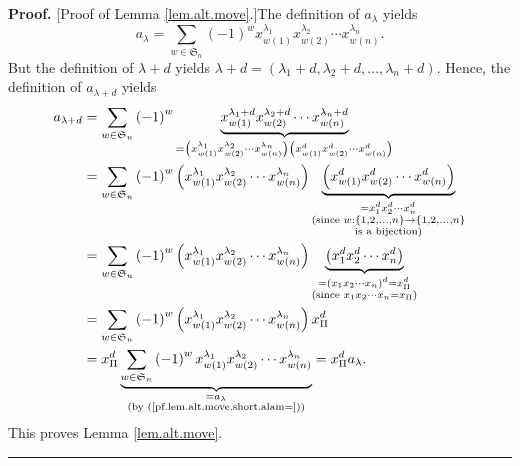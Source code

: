 \documentclass[numbers=enddot,12pt,final,onecolumn,notitlepage]{scrartcl}%
\theoremstyle{definition}
\newenvironment{proof}[1][Proof]{\noindent\textbf{#1.} }{\ \rule{0.5em}{0.5em}}
\let\sumnonlimits\sum
\renewcommand{\sum}{\sumnonlimits\limits}
\newenvironment{vershort}{}{}
\begin{document}
\begin{vershort}


\begin{proof}
[Proof of Lemma \ref{lem.alt.move}.]The definition of $a_{\lambda}$ yields%
\begin{equation}
a_{\lambda}=\sum_{w\in\mathfrak{S}_{n}}\left(  -1\right)  ^{w}x_{w\left(
1\right)  }^{\lambda_{1}}x_{w\left(  2\right)  }^{\lambda_{2}}\cdots
x_{w\left(  n\right)  }^{\lambda_{n}}. \label{pf.lem.alt.move.short.alam=}%
\end{equation}
But the definition of $\lambda+d$ yields $\lambda+d=\left(  \lambda
_{1}+d,\lambda_{2}+d,\ldots,\lambda_{n}+d\right)  $. Hence, the definition of
$a_{\lambda+d}$ yields%
\begin{align*}
a_{\lambda+d}  &  =\sum_{w\in\mathfrak{S}_{n}}\left(  -1\right)
^{w}\underbrace{x_{w\left(  1\right)  }^{\lambda_{1}+d}x_{w\left(  2\right)
}^{\lambda_{2}+d}\cdots x_{w\left(  n\right)  }^{\lambda_{n}+d}}_{=\left(
x_{w\left(  1\right)  }^{\lambda_{1}}x_{w\left(  2\right)  }^{\lambda_{2}%
}\cdots x_{w\left(  n\right)  }^{\lambda_{n}}\right)  \left(  x_{w\left(
1\right)  }^{d}x_{w\left(  2\right)  }^{d}\cdots x_{w\left(  n\right)  }%
^{d}\right)  }\\
&  =\sum_{w\in\mathfrak{S}_{n}}\left(  -1\right)  ^{w}\left(  x_{w\left(
1\right)  }^{\lambda_{1}}x_{w\left(  2\right)  }^{\lambda_{2}}\cdots
x_{w\left(  n\right)  }^{\lambda_{n}}\right)  \underbrace{\left(  x_{w\left(
1\right)  }^{d}x_{w\left(  2\right)  }^{d}\cdots x_{w\left(  n\right)  }%
^{d}\right)  }_{\substack{=x_{1}^{d}x_{2}^{d}\cdots x_{n}^{d}\\\text{(since
}w:\left\{  1,2,\ldots,n\right\}  \rightarrow\left\{  1,2,\ldots,n\right\}
\\\text{is a bijection)}}}\\
&  =\sum_{w\in\mathfrak{S}_{n}}\left(  -1\right)  ^{w}\left(  x_{w\left(
1\right)  }^{\lambda_{1}}x_{w\left(  2\right)  }^{\lambda_{2}}\cdots
x_{w\left(  n\right)  }^{\lambda_{n}}\right)  \underbrace{\left(  x_{1}%
^{d}x_{2}^{d}\cdots x_{n}^{d}\right)  }_{\substack{=\left(  x_{1}x_{2}\cdots
x_{n}\right)  ^{d}=x_{\Pi}^{d}\\\text{(since }x_{1}x_{2}\cdots x_{n}=x_{\Pi
}\text{)}}}\\
&  =\sum_{w\in\mathfrak{S}_{n}}\left(  -1\right)  ^{w}\left(  x_{w\left(
1\right)  }^{\lambda_{1}}x_{w\left(  2\right)  }^{\lambda_{2}}\cdots
x_{w\left(  n\right)  }^{\lambda_{n}}\right)  x_{\Pi}^{d}\\
&  =x_{\Pi}^{d}\underbrace{\sum_{w\in\mathfrak{S}_{n}}\left(  -1\right)
^{w}x_{w\left(  1\right)  }^{\lambda_{1}}x_{w\left(  2\right)  }^{\lambda_{2}%
}\cdots x_{w\left(  n\right)  }^{\lambda_{n}}}_{\substack{=a_{\lambda
}\\\text{(by (\ref{pf.lem.alt.move.short.alam=}))}}}=x_{\Pi}^{d}a_{\lambda}.
\end{align*}
This proves Lemma \ref{lem.alt.move}.
\end{proof}
\end{vershort}
\end{document}

